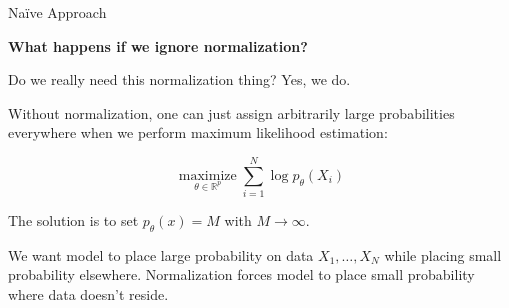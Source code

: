 \begin{frame}[allowframebreaks]
\begin{myconceptblock}{10.4}{Naïve Approach}
    \par\noindent\textcolor{gray}{\hdashrule{\textwidth}{0.4pt}{1pt 2pt}}

    \textbf{What happens if we ignore normalization?}

    Do we really need this normalization thing? Yes, we do.

    Without normalization, one can just assign arbitrarily large probabilities everywhere when we perform maximum likelihood estimation:

    $$
    \underset{\theta \in \mathbb{R}^{p}}{\operatorname{maximize}} \sum_{i=1}^{N} \log p_{\theta}\left(X_{i}\right)
    $$

    The solution is to set $p_{\theta}(x)=M$ with $M \rightarrow \infty$.

    We want model to place large probability on data $X_{1}, \ldots, X_{N}$ while placing small probability elsewhere. Normalization forces model to place small probability where data doesn't reside.
\end{myconceptblock}

\end{frame}


\begin{frame}[allowframebreaks]

\par\noindent\textcolor{gray}{\hdashrule{\textwidth}{0.4pt}{1pt 2pt}}

\end{frame}

